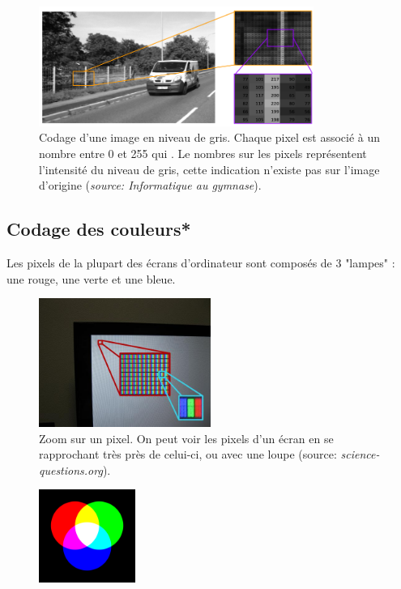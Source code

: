 \begin{figure}[h!]
	\centering
	\includegraphics[trim=10 0 0 20,width=0.8\textwidth]{Images/codage_information/image_gris.png}
	\caption{Codage d'une image en niveau de gris. Chaque pixel est associé à un nombre entre 0 et 255 qui . Le nombres sur les pixels représentent l'intensité du niveau de gris, cette indication n'existe pas sur l'image d'origine (\textit{source: Informatique au gymnase}).}
\end{figure}

\subsection{Codage des couleurs*}
Les pixels de la plupart des écrans d'ordinateur sont composés de 3 "lampes" : une rouge, une verte et une bleue.

\begin{figure}[h!]
	\centering
	\includegraphics[trim=0 0 60 0,width=0.5\textwidth]{Images/codage_information/Zoom_sur_un_pixel.jpg}
	\caption{Zoom sur un pixel. On peut voir les pixels d'un écran en se rapprochant très près de celui-ci, ou avec une loupe (source: \textit{science-questions.org}).}
\end{figure}

\begin{figure}
	\includegraphics[trim=0 0 0 20,width=0.28\textwidth]{Images/codage_information/Addition_des_couleurs.png}
\end{figure}

